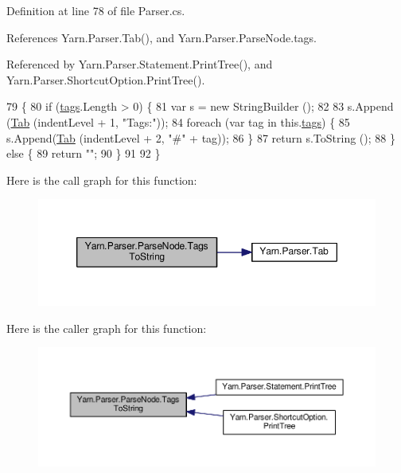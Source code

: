 Definition at line 78 of file Parser.\-cs.



References Yarn.\-Parser.\-Tab(), and Yarn.\-Parser.\-Parse\-Node.\-tags.



Referenced by Yarn.\-Parser.\-Statement.\-Print\-Tree(), and Yarn.\-Parser.\-Shortcut\-Option.\-Print\-Tree().


\begin{DoxyCode}
79             \{
80                 \textcolor{keywordflow}{if} (\hyperlink{a00142_a58b3a15788fd2d4127d73619dc6d04ae}{tags}.Length > 0) \{
81                     var s = \textcolor{keyword}{new} StringBuilder ();
82 
83                     s.Append (\hyperlink{a00143_aa8fa36b46de12a1c561d77b99c4b9ae3}{Tab} (indentLevel + 1, \textcolor{stringliteral}{"Tags:"}));
84                     \textcolor{keywordflow}{foreach} (var tag \textcolor{keywordflow}{in} this.\hyperlink{a00142_a58b3a15788fd2d4127d73619dc6d04ae}{tags}) \{
85                         s.Append(\hyperlink{a00143_aa8fa36b46de12a1c561d77b99c4b9ae3}{Tab} (indentLevel + 2, \textcolor{stringliteral}{"#"} + tag));
86                     \}
87                     \textcolor{keywordflow}{return} s.ToString ();
88                 \} \textcolor{keywordflow}{else} \{
89                     \textcolor{keywordflow}{return} \textcolor{stringliteral}{""};
90                 \}
91 
92             \}
\end{DoxyCode}


Here is the call graph for this function\-:
\nopagebreak
\begin{figure}[H]
\begin{center}
\leavevmode
\includegraphics[width=350pt]{a00142_a054f36c80d5eeacd569a8859f599af67_cgraph}
\end{center}
\end{figure}




Here is the caller graph for this function\-:
\nopagebreak
\begin{figure}[H]
\begin{center}
\leavevmode
\includegraphics[width=350pt]{a00142_a054f36c80d5eeacd569a8859f599af67_icgraph}
\end{center}
\end{figure}


